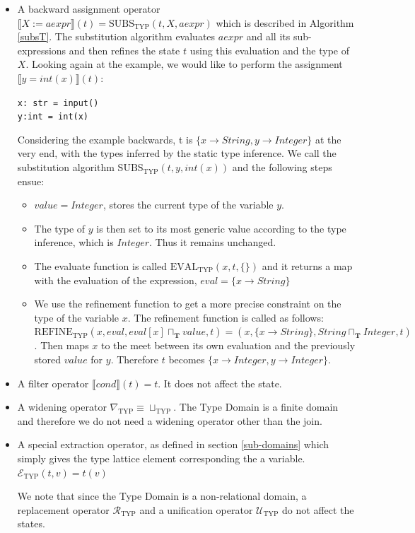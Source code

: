 \documentclass[10pt]{report}
\begin{document}
\begin{itemize}
\item A backward assignment operator $ \llbracket X:=aexpr \rrbracket(t) = \mathrm{SUBS}_{\mathrm{TYP}}(t, X, aexpr)$ which is described in Algorithm \ref{subsT}. The substitution algorithm evaluates $ aexpr $ and all its sub-expressions and then refines the state $ t $ using this evaluation and the type of $ X $. Looking again at the example, we would like to perform the assignment $ \llbracket y = int(x) \rrbracket(t)$: 
\begin{center}
	\verb|x: str = input()| \\
	\verb|y:int = int(x)|
\end{center}
Considering the example backwards, t is $ \lbrace x \rightarrow String, y \rightarrow Integer \rbrace$ at the very end, with the types inferred by the static type inference. We call the substitution algorithm
 $\mathrm{SUBS}_{\mathrm{TYP}}(t, y, int(x))$ and the following steps ensue:
 \begin{itemize}
 	\item $ value = Integer $, stores the current type of the variable  $ y $. 
 	\item The type of $ y $ is then set to its most generic value according to the type inference, which is $ Integer $. Thus it remains unchanged. 
 	\item The evaluate function is called $ \mathrm{EVAL}_{\mathrm{TYP}}(x, t, \lbrace \rbrace) $ and it returns a map with the evaluation of the expression, $ eval = \lbrace  x \rightarrow String \rbrace $ 
 	\item We use the refinement function to get a more precise constraint on the type of the variable $ x $. The refinement function is called as follows: $ \mathrm{REFINE}_{\mathrm{TYP}}(x, eval,eval[x] \sqcap_{\mathbf{T}} value, t)  = (x, \lbrace  x \rightarrow String \rbrace, String \sqcap_{\mathbf{T}} Integer, t)$. Then maps $ x $ to the meet between its own evaluation and the previously stored $ value $ for $ y $. Therefore $ t $ becomes $ \lbrace  x \rightarrow Integer, y \rightarrow Integer \rbrace$.  
 \end{itemize}
 
\item A filter operator $ \llbracket cond \rrbracket(t) = t $. It does not affect the state.
\item A widening operator $ \nabla_{\mathrm{TYP}} \equiv \sqcup_{\mathrm{TYP}} $. The Type Domain is a finite domain and therefore we do not need a widening operator other than the join. 

\item A special extraction operator, as defined in section \ref{sub-domains} which simply gives the type lattice element corresponding the a variable. $ \mathcal{E}_{\mathrm{TYP}}(t, v)  = t(v) $

We note that since the Type Domain is a non-relational domain, a replacement operator $ \mathcal{R}_{\mathrm{TYP}} $ and a unification operator $ \mathcal{U}_{\mathrm{TYP}} $ do not affect the states. 

\end{itemize}
\end{document}
